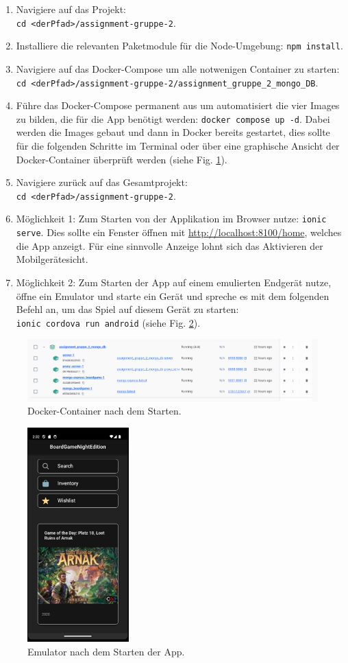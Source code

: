 \begin{enumerate}
    \item Navigiere auf das Projekt: \\\texttt{cd <derPfad>/assignment-gruppe-2}.
    \item Installiere die relevanten Paketmodule für die Node-Umgebung: \texttt{npm install}.
    \item Navigiere auf das Docker-Compose um alle notwenigen Container zu starten: \\\texttt{cd <derPfad>/assignment-gruppe-2/assignment\_gruppe\_2\_mongo\_DB}.
    \item Führe das Docker-Compose permanent aus um automatisiert die vier Images zu bilden, die für die App benötigt werden: \texttt{docker compose up -d}. Dabei werden die Images gebaut und dann in Docker bereits gestartet, dies sollte für die folgenden Schritte im Terminal oder über eine graphische Ansicht der Docker-Container überprüft werden (siehe Fig. \ref{fig:docker}).
    \item Navigiere zurück auf das Gesamtprojekt: \\\texttt{cd <derPfad>/assignment-gruppe-2}.
    \item Möglichkeit 1: Zum Starten von der Applikation im Browser nutze: \texttt{ionic serve}. Dies sollte ein Fenster öffnen mit \url{http://localhost:8100/home}, welches die App anzeigt. Für eine sinnvolle Anzeige lohnt sich das Aktivieren der Mobilgerätesicht.
    \item Möglichkeit 2: Zum Starten der App auf einem emulierten Endgerät nutze, öffne ein Emulator und starte ein Gerät und spreche es mit dem folgenden Befehl an, um das Spiel auf diesem Gerät zu starten: \\\texttt{ionic cordova run android} (siehe Fig. \ref{fig:emulator}).
\end{enumerate}
\begin{figure}[H]
    \centering
    \includegraphics[width=1\textwidth]{graphics/docker.png}
    \caption{Docker-Container nach dem Starten.}
    \label{fig:docker}
\end{figure}
\begin{figure}[H]
    \centering
    \includegraphics[width=0.35\textwidth]{graphics/emulator.png}
    \caption{Emulator nach dem Starten der App.}
    \label{fig:emulator}
\end{figure}